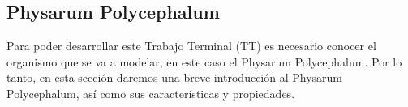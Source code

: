 \subsection{Physarum Polycephalum}
    \label{sec:PhysarumPolycephalum}
    Para poder desarrollar este Trabajo Terminal (TT) es necesario conocer el organismo que se va a modelar, 
        en este caso el Physarum Polycephalum. Por lo tanto, en esta secci\'on daremos una breve introducci\'on
        al Physarum Polycephalum, as\'i como sus caracter\'isticas y propiedades.
    \vskip 0.5cm
    
    
    
    